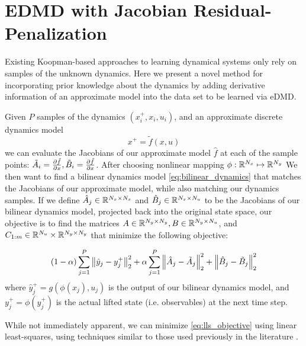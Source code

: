 \documentclass{article}
\begin{document}
\section{EDMD with Jacobian Residual-Penalization}
Existing Koopman-based approaches to learning dynamical systems only rely on samples of the unknown 
dynamics. Here we present a novel method for incorporating prior knowledge about the dynamics by adding 
derivative information of an approximate model into the data set to be learned via eDMD.

Given $P$ samples of the dynamics $(x_i^+, x_i, u_i)$, and an approximate discrete dynamics model 
\begin{equation}
    x^+ = \tilde{f}(x,u)
\end{equation}
we can evaluate the Jacobians of our approximate model $\hat{f}$ at each of the sample points: 
$\tilde{A}_i = \pdv{\tilde{f}}{x}, \tilde{B}_i = \pdv{\tilde{f}}{x}$. After choosing nonlinear mapping
$\phi : \mathbb{R}^{N_x} \mapsto \mathbb{R}^{N_y}$ We then want to find a bilinear dynamics model 
\eqref{eq:bilinear_dynamics} that matches the Jacobians of our approximate model, while also matching 
our dynamics samples. If we define $\hat{A}_j \in \mathbb{R}^{N_x \times N_x}$ and 
$\hat{B}_j \in \mathbb{R}^{N_x \times N_u}$ to be 
the Jacobians of our bilinear dynamics model, projected back into the original state space, our objective 
is to find the matrices $A \in \mathbb{R}^{N_y \times N_y},B \in \mathbb{R}^{N_y \times N_u}$, and 
$C_{1:m} \in \mathbb{R}^{N_u} \times \mathbb{R}^{N_y \times N_y}$ that minimize the following objective:

\begin{equation} \label{eq:lls_objective}
    (1- \alpha) \sum_{j=1}^P \norm{\hat{y}_j - y_j^+}_2^2 + 
        \alpha  \sum_{j=1}^P \norm{\hat{A}_j - \tilde{A}_j}_2^2 + 
                             \norm{\hat{B}_j - \tilde{B}_j}_2^2 
\end{equation}
where $\hat{y}_j^+ = g\left(\phi(x_j), u_j\right)$ is the output of our bilinear  dynamics model, 
and $y_j^+ = \phi(y_j^+)$ is the actual lifted state (i.e. observables) at the next time step.

While not immediately apparent, we can minimize \eqref{eq:lls_objective} using linear least-squares, using 
techniques similar to those used previously in the literature .
\end{document}
